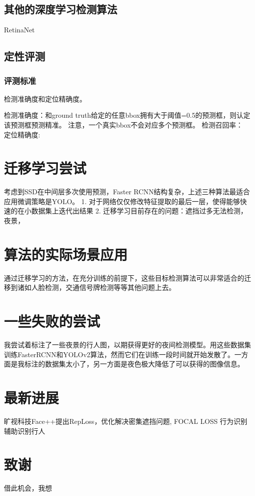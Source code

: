 \documentclass[12pt,a4paper,titlepage]{article}
\begin{document}
\subsection{其他的深度学习检测算法}
RetinaNet

\subsection{定性评测}
\subsubsection{评测标准}
检测准确度和定位精确度。

检测准确度：和ground truth给定的任意bbox拥有大于阈值=0.5的预测框，则认定该预测框预测精准。 注意，一个真实bbox不会对应多个预测框。
检测召回率：
定位精确度: 


\section{迁移学习尝试}
考虑到SSD在中间层多次使用预测，Faster RCNN结构复杂，上述三种算法最适合应用微调策略是YOLO。
1. 对于网络仅仅修改特征提取的最后一层，使得能够快速的在小数据集上迭代出结果
2. 迁移学习目前存在的问题：遮挡过多无法检测，夜景，


\section{算法的实际场景应用}
通过迁移学习的方法，在充分训练的前提下，这些目标检测算法可以非常适合的迁移到诸如人脸检测，交通信号牌检测等等其他问题上去。

\section{一些失败的尝试}
我尝试着标注了一些夜景的行人图，以期获得更好的夜间检测模型。用这些数据集训练FasterRCNN和YOLOv2算法，然而它们在训练一段时间就开始发散了。一方面是我标注的数据集太小了，另一方面是夜色极大降低了可以获得的图像信息。

\section{最新进展}
旷视科技Face++提出RepLoss，优化解决密集遮挡问题,
FOCAL LOSS
行为识别辅助识别行人


\section*{致谢}
借此机会，我想
\end{document}

